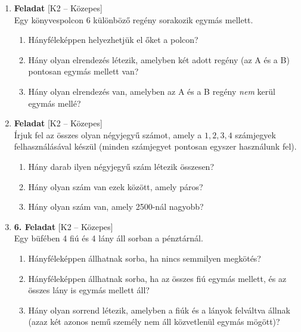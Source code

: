 \documentclass[12pt,a4paper]{article}
\begin{document}
\begin{enumerate}[label=\arabic*., leftmargin=*]
    \item \textbf{Feladat} \textsf{\small [K2 – Közepes]} \\
    Egy könyvespolcon 6 különböző regény sorakozik egymás mellett.
    \begin{enumerate}[label=\alph*)]
        \item Hányféleképpen helyezhetjük el őket a polcon?
        \item Hány olyan elrendezés létezik, amelyben két adott regény (az A és a B) pontosan egymás mellett van?
        \item Hány olyan elrendezés van, amelyben az A és a B regény \emph{nem} kerül egymás mellé?
    \end{enumerate}

    \vspace{0.4cm}

    \item \textbf{Feladat} \textsf{\small [K2 – Közepes]} \\
    Írjuk fel az összes olyan négyjegyű számot, amely a $1, 2, 3, 4$ számjegyek felhasználásával készül (minden számjegyet pontosan egyszer használunk fel). 
    \begin{enumerate}[label=\alph*)]
        \item Hány darab ilyen négyjegyű szám létezik összesen?
        \item Hány olyan szám van ezek között, amely páros?
        \item Hány olyan szám van, amely 2500-nál nagyobb?
    \end{enumerate}

    \vspace{0.4cm}

    \item \textbf{6. Feladat} \textsf{\small [K2 – Közepes]} \\
    Egy büfében 4 fiú és 4 lány áll sorban a pénztárnál.
    \begin{enumerate}[label=\alph*)]
        \item Hányféleképpen állhatnak sorba, ha nincs semmilyen megkötés?
        \item Hányféleképpen állhatnak sorba, ha az összes fiú egymás mellett, és az összes lány is egymás mellett áll?
        \item Hány olyan sorrend létezik, amelyben a fiúk és a lányok felváltva állnak (azaz két azonos nemű személy nem áll közvetlenül egymás mögött)?
    \end{enumerate}


\end{enumerate}
\end{document}
